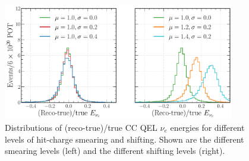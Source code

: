 \begin{table} %
     \caption[Classification performance metrics for different levels of hit-charge smearing and
    shifting] {Classification performance metrics for different levels of hit-charge smearing and
    shifting. The highest scoring values for each metric are indicated in bold.}
    \label{tab:calib_charge}
\end{table}

\begin{figure} %
    \includegraphics[width=0.9\textwidth]{diagrams/7-results/calib_charge_energy.pdf}
    \caption[Distributions of (reco-true)/true $\nu_{e}$ energies for different levels of
        hit-charge smearing and shifting] {Distributions of (reco-true)/true CC QEL $\nu_{e}$
        energies for different levels of hit-charge smearing and shifting. Shown are the different
        smearing levels (left) and the different shifting levels (right).}
    \label{fig:calib_charge_energy}
\end{figure}

